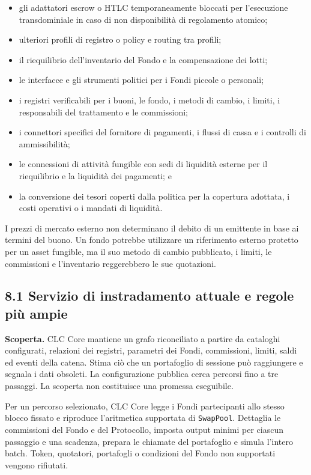 \documentclass[11pt]{article}
\begin{document}
\begin{itemize}[leftmargin=*]
\item gli adattatori escrow o HTLC temporaneamente bloccati per l'esecuzione transdominiale in caso di non disponibilità di regolamento atomico;
\item ulteriori profili di registro o policy e routing tra profili;
\item il riequilibrio dell'inventario del Fondo e la compensazione dei lotti;
\item le interfacce e gli strumenti politici per i Fondi piccole o personali;
\item i registri verificabili per i buoni, le fondo, i metodi di cambio, i limiti, i responsabili del trattamento e le commissioni;
\item i connettori specifici del fornitore di pagamenti, i flussi di cassa e i controlli di ammissibilità;
\item le connessioni di attività fungible con sedi di liquidità esterne per il riequilibrio e la liquidità dei pagamenti; e
\item la conversione dei tesori coperti dalla politica per la copertura adottata, i costi operativi o i mandati di liquidità.
\end{itemize}
I prezzi di mercato esterno non determinano il debito di un emittente in base ai termini del buono. Un fondo potrebbe utilizzare un riferimento esterno protetto per un asset fungible, ma il suo metodo di cambio pubblicato, i limiti, le commissioni e l'inventario reggerebbero le sue quotazioni.

\subsection*{8.1 Servizio di instradamento attuale e regole più ampie}

\textbf{Scoperta.} CLC Core mantiene un grafo riconciliato a partire da cataloghi configurati, relazioni dei registri, parametri dei Fondi, commissioni, limiti, saldi ed eventi della catena. Stima ciò che un portafoglio di sessione può raggiungere e segnala i dati obsoleti. La configurazione pubblica cerca percorsi fino a tre passaggi. La scoperta non costituisce una promessa eseguibile.

Per un percorso selezionato, CLC Core legge i Fondi partecipanti allo stesso blocco fissato e riproduce l'aritmetica supportata di \texttt{SwapPool}. Dettaglia le commissioni del Fondo e del Protocollo, imposta output minimi per ciascun passaggio e una scadenza, prepara le chiamate del portafoglio e simula l'intero batch. Token, quotatori, portafogli o condizioni del Fondo non supportati vengono rifiutati.
\end{document}
